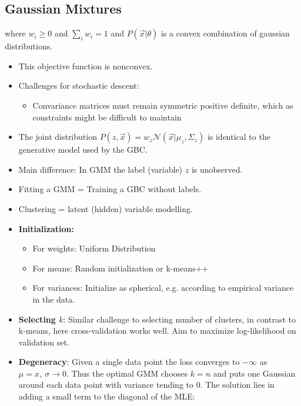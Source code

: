 \documentclass[10pt,a4paper]{scrartcl}
\newcommand{\Argmin}[2]{\text{arg}\underset{#1}{\min}\left(#2\right)}
\begin{document}
\begin{multicols*}{2}
\subsection{Gaussian Mixtures}


where $w_i\geq 0$ and $\sum\limits_iw_i=1$ and $P(\vec{x}|\theta)$ is a convex combination of gaussian distributions.

\mportant{$(\mu^\ast,\Sigma^\ast,w^\ast)=\Argmin{}{-\sum\limits_{i}\log\sum\limits_{j=1}^k w_j\mathcal{N}(\vec{x}_i|\mu_j,\Sigma_j)}$}

\begin{itemize}
\item This objective function is nonconvex.
\item Challenges for stochastic descent:
\begin{itemize}
\item Convariance matrices must remain symmetric positive definite, which as constraints might be difficult to maintain
\end{itemize}
\item The joint distribution $P(z,\vec{x})=w_z\mathcal{N}(\vec{x}|\mu_z,\Sigma_z)$ is identical to the generative model used by the GBC.
\item Main difference: In GMM the label (variable) $z$ is unobserved.
\item Fitting a GMM = Training a GBC without labels.
\item Clustering = latent (hidden) variable modelling.
\item \textbf{Initialization:}
\begin{itemize}
\item For weights: Uniform Distribution
\item For means: Random initialization or k-means++
\item For variances: Initialize as spherical, e.g. according to empirical variance in the data.
\end{itemize}
\item \textbf{Selecting $k$}: Similar challenge to selecting number of clusters, in contrast to k-means, here cross-validation works well. Aim to maximize log-likelihood on validation set.
\item \textbf{Degeneracy}: Given a single data point the loss converges to $-\infty$ as $\mu=x,\ \sigma\rightarrow 0$. Thus the optimal GMM chooses $k=n$ and puts one Gaussian around each data point with variance tending to 0. The solution lies in adding a small term to the diagonal of the MLE:


\end{itemize}
\end{multicols*}
\end{document}
